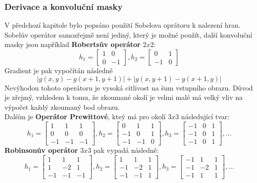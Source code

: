 \documentclass{thesis}%
\begin{document}
\subsubsection{Derivace a konvoluční masky}
V předchozí kapitole bylo popsáno použití Sobelova oprátoru k nalezení hran. Sobelův operátor samozřejmě není jediný, který je možné použít, další konvoluční masky jsou například \textbf{Robertsův operátor} $2x2$:
$$
h_1 = \left[
\begin{matrix}
1&0\\
0&-1
\end{matrix}
\right],
h_2 = \left[
\begin{matrix}
0&1\\
-1&0
\end{matrix}
\right]
$$
Gradient je pak vypočítán následně
\begin{equation}
|g(x,y) - g(x+1,y+1)|+|g(x,y+1)-g(x+1,y)|
\end{equation}
Nevýhodou tohoto operátoru je vysoká citlivost na šum vstupního obrazu. Důvod je zřejmý, vzhledem k tomu, že zkoumané okolí je velmi malé má velký vliv na výpočet každý zkoumaný bod obrazu.\\
Dalším je \textbf{Operátor Prewittové}, kteý  má pro okolí $3x3$ následující tvar:
$$
h_1 = \left[
\begin{matrix}
1&1&1\\
0&0&0\\
-1&-1&-1
\end{matrix}
\right],
h_2 = \left[
\begin{matrix}
0&1&1\\
-1&0&1\\
-1&-1&0\end{matrix}
\right],
h_3 = \left[
\begin{matrix}
-1&0&1\\
-1&0&1\\
-1&0&1
\end{matrix}
\right],...
$$
\textbf{Robinsonův operátor} $3x3$ pak vypadá následně:
$$
h_1 = \left[
\begin{matrix}
1&1&1\\
1&-2&1\\
-1&-1&-1
\end{matrix}
\right],
h_2 = \left[
\begin{matrix}
1&1&1\\
-1&-2&1\\
-1&-1&1\end{matrix}
\right],
h_3 = \left[
\begin{matrix}
-1&1&1\\
-1&-2&1\\
-1&1&1
\end{matrix}
\right],...
$$
\end{document}

